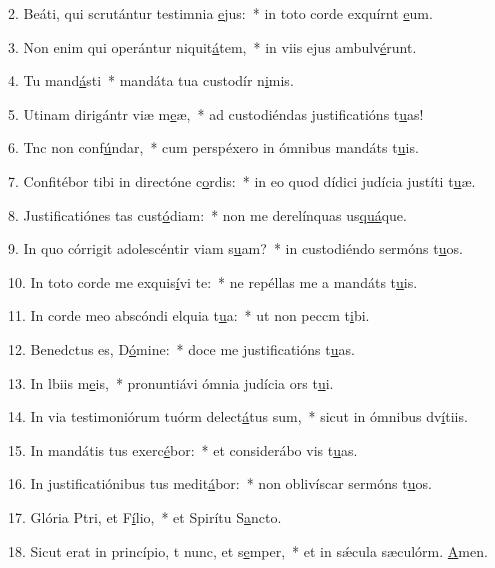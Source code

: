 2. Beáti, qui scrutántur testimnia \uline{e}jus:~* in toto corde exquírnt \uline{e}um.\par 
3. Non enim qui operántur niquit\uline{á}tem,~* in viis ejus ambulv\uline{é}runt.\par 
4. Tu mand\uline{á}sti~* mandáta tua custodír n\uline{i}mis.\par 
5. Utinam dirigántr viæ m\uline{e}æ,~* ad custodiéndas justificatións t\uline{u}as!\par 
6. Tnc non conf\uline{ú}ndar,~* cum perspéxero in ómnibus mandáts t\uline{u}is.\par 
7. Confitébor tibi in directóne c\uline{o}rdis:~* in eo quod dídici judícia justíti t\uline{u}æ.\par 
8. Justificatiónes tas cust\uline{ó}diam:~* non me derelínquas us\uline{quá}que.\par 
9. In quo córrigit adolescéntir viam s\uline{u}am?~* in custodiéndo sermóns t\uline{u}os.\par 
10. In toto corde me exquis\uline{í}vi te:~* ne repéllas me a mandáts t\uline{u}is.\par 
11. In corde meo abscóndi elquia t\uline{u}a:~* ut non peccm t\uline{i}bi.\par 
12. Benedctus es, D\uline{ó}mine:~* doce me justificatións t\uline{u}as.\par 
13. In lbiis m\uline{e}is,~* pronuntiávi ómnia judícia ors t\uline{u}i.\par 
14. In via testimoniórum tuórm delect\uline{á}tus sum,~* sicut in ómnibus dv\uline{í}tiis.\par 
15. In mandátis tus exerc\uline{é}bor:~* et considerábo vis t\uline{u}as.\par 
16. In justificatiónibus tus medit\uline{á}bor:~* non oblivíscar sermóns t\uline{u}os.\par 
17. Glória Ptri, et F\uline{í}lio,~* et Spirítu S\uline{a}ncto.\par 
18. Sicut erat in princípio, t nunc, et s\uline{e}mper,~* et in sǽcula sæculórm. \uline{A}men.\par 
